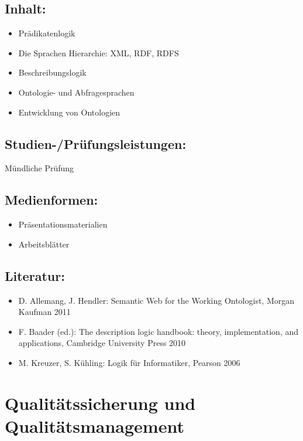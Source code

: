 \section*{Inhalt:}\label{inhalt-20}

\begin{itemize}
\item
  Prädikatenlogik
\item
  Die Sprachen Hierarchie: XML, RDF, RDFS
\item
  Beschreibungslogik
\item
  Ontologie- und Abfragesprachen
\item
  Entwicklung von Ontologien
\end{itemize}

\section*{Studien-/Prüfungsleistungen:}\label{studien-pruxfcfungsleistungen-20}

Mündliche Prüfung

\section*{Medienformen:}\label{medienformen-20}

\begin{itemize}
\item
  Präsentationsmaterialien
\item
  Arbeitsblätter
\end{itemize}

\section*{Literatur:}\label{literatur-17}

\begin{itemize}
\item
  D. Allemang, J. Hendler: Semantic Web for the Working Ontologist,
  Morgan Kaufman 2011
\item
  F. Baader (ed.): The description logic handbook: theory,
  implementation, and applications, Cambridge University Press 2010
\item
  M. Kreuzer, S. Kühling: Logik für Informatiker, Pearson 2006
\end{itemize}

\chapter{Qualitätssicherung und
Qualitätsmanagement}\label{qualituxe4tssicherung-und-qualituxe4tsmanagement}

